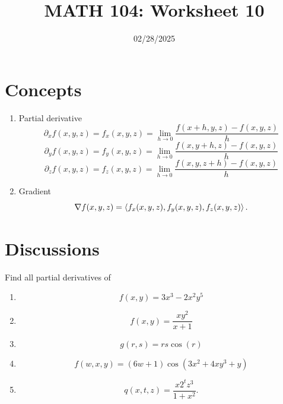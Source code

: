 \documentclass[12pt]{amsart}
\title{ MATH 104: Worksheet 10}
\author{}
\date{02/28/2025}
\begin{document}
\maketitle


\section{Concepts}

\begin{enumerate}
	\item Partial derivative
	      \begin{equation*}
		      \partial_x f (x,y,z) = f_x (x,y,z) =
		      \lim_{h\to 0} \frac{ f(x+h, y,z) - f(x,y,z) }{h}
	      \end{equation*}
	      \begin{equation*}
		      \partial_y f (x,y,z) = f_y (x,y,z) =
		      \lim_{h\to 0} \frac{ f(x, y+h,z) - f(x,y,z) }{h}
	      \end{equation*}
	      \begin{equation*}
		      \partial_z f (x,y,z) = f_z (x,y,z) =
		      \lim_{h\to 0} \frac{ f(x, y, z+ h) - f(x,y, z) }{h}
	      \end{equation*}
	\item Gradient
	      \begin{equation*}
		      \nabla f(x,y,z) = \langle f_x (x,y,z), f_y (x,y,z), f_z  (x,y,z)\rangle \,.
	      \end{equation*}
\end{enumerate}


\section{Discussions}

\begin{question}
	Find all partial derivatives of
	\begin{enumerate}
		\item  $$ f(x,y) = 3x^3 - 2x^2y^5$$
		      \vspace{7cm}
		\item  $$ f(x,y) = \frac{xy^2}{x+1} $$
		      \vspace{7cm}
		\item  \[ g(r,s) = rs \cos(r) \]
		      \vspace{7cm}
		\item  \[ f(w,x,y) = (6w+1) \cos(3x^2 + 4xy^3 + y) \]
		      \vspace{7cm}
		\item
		      \[
			      q(x,t,z) = \frac{x 2^t z^3}{1 + x^2}.
		      \]
		      \vspace{7cm}
	\end{enumerate}
\end{question}
\end{document}
